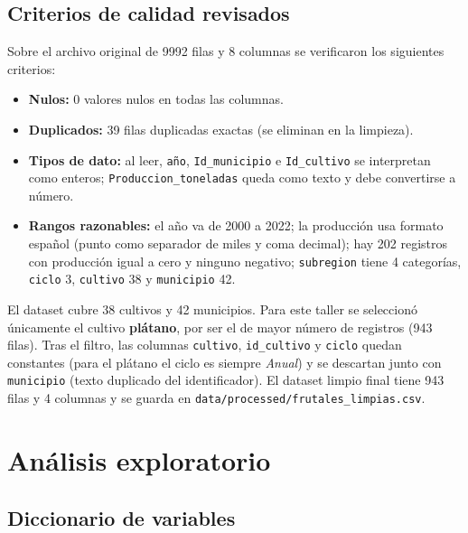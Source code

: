 \documentclass[11pt,a4paper]{article}
\begin{document}
\subsection{Criterios de calidad revisados}

Sobre el archivo original de 9992 filas y 8 columnas se verificaron los siguientes criterios:

\begin{itemize}
  \item \textbf{Nulos:} 0 valores nulos en todas las columnas.
  \item \textbf{Duplicados:} 39 filas duplicadas exactas (se eliminan en la limpieza).
  \item \textbf{Tipos de dato:} al leer, \texttt{año}, \texttt{Id\_municipio} e \texttt{Id\_cultivo}
        se interpretan como enteros; \texttt{Produccion\_toneladas} queda como texto y debe
        convertirse a número.
  \item \textbf{Rangos razonables:} el año va de 2000 a 2022; la producción usa formato español
        (punto como separador de miles y coma decimal); hay 202 registros con producción igual a
        cero y ninguno negativo; \texttt{subregion} tiene 4 categorías, \texttt{ciclo} 3,
        \texttt{cultivo} 38 y \texttt{municipio} 42.
\end{itemize}

El dataset cubre 38 cultivos y 42 municipios. Para este taller se seleccionó únicamente el cultivo
\textbf{plátano}, por ser el de mayor número de registros (943 filas). Tras el filtro, las columnas
\texttt{cultivo}, \texttt{id\_cultivo} y \texttt{ciclo} quedan constantes (para el plátano el ciclo
es siempre \emph{Anual}) y se descartan junto con \texttt{municipio} (texto duplicado del
identificador). El dataset limpio final tiene 943 filas y 4 columnas y se guarda en
\texttt{data/processed/frutales\_limpias.csv}.

\section{Análisis exploratorio}

\subsection{Diccionario de variables}
\end{document}
